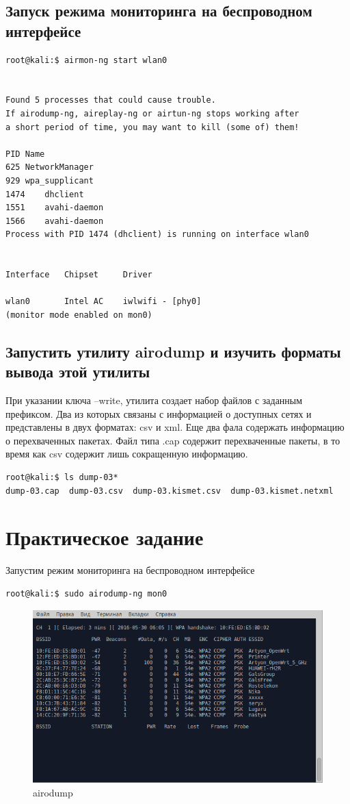 \subsection{Запуск режима мониторинга на беспроводном интерфейсе}
\begin{lstlisting}
root@kali:$ airmon-ng start wlan0


Found 5 processes that could cause trouble.
If airodump-ng, aireplay-ng or airtun-ng stops working after
a short period of time, you may want to kill (some of) them!

PID	Name
625	NetworkManager
929	wpa_supplicant
1474	dhclient
1551	avahi-daemon
1566	avahi-daemon
Process with PID 1474 (dhclient) is running on interface wlan0


Interface	Chipset		Driver

wlan0		Intel AC	iwlwifi - [phy0]
(monitor mode enabled on mon0)
\end{lstlisting}
\subsection{Запустить утилиту airodump и изучить форматы вывода этой утилиты}
При указании ключа --write, утилита создает набор файлов с заданным префиксом. Два из которых связаны с информацией о доступных сетях и представлены в двух форматах: csv и xml. Еще два фала содержать информацию о перехваченных пакетах. Файл типа .cap содержит перехваченные пакеты, в то время как csv содержит лишь сокращенную информацию.

\begin{lstlisting}
root@kali:$ ls dump-03*
dump-03.cap  dump-03.csv  dump-03.kismet.csv  dump-03.kismet.netxml
\end{lstlisting}
\section{Практическое задание}
Запустим режим мониторинга на беспроводном интерфейсе

\begin{lstlisting}
root@kali:$ sudo airodump-ng mon0
\end{lstlisting}

\begin{figure}[H]
	\centering
	\includegraphics[width=\textwidth]{figures/1.png}
	\caption{airodump}
\end{figure}

